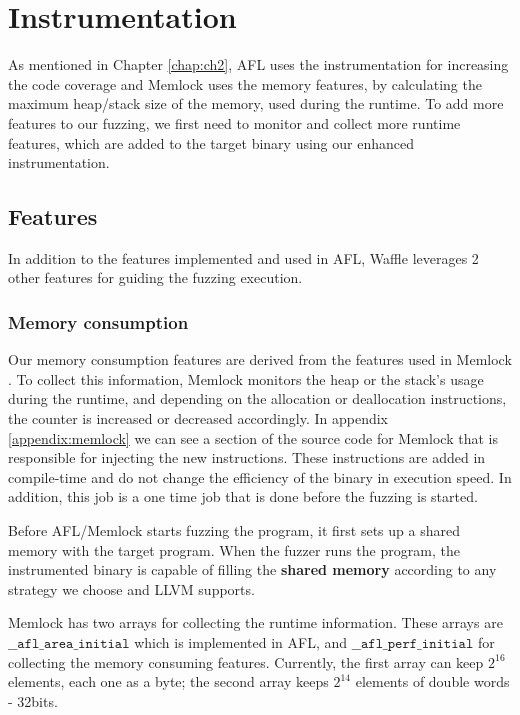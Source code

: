\section{Instrumentation}

As mentioned in Chapter \ref{chap:ch2}, AFL uses the instrumentation for increasing the code coverage and Memlock uses the memory features, by calculating the maximum heap/stack size of the memory, used during the runtime. To add more features to our fuzzing, we first need to monitor and collect more runtime features, which are added to the target binary using our enhanced instrumentation.

\subsection{Features}

In addition to the features implemented and used in AFL, Waffle leverages 2 other features for guiding the fuzzing execution.
\subsubsection{Memory consumption}
Our memory consumption features are derived from the features used in Memlock \cite{wen2020memlock}. To collect this information, Memlock monitors the heap or the stack's usage during the runtime, and depending on the allocation or deallocation instructions, the counter is increased or decreased accordingly. In appendix \ref{appendix:memlock} we can see a section of the source code for Memlock that is responsible for injecting the new instructions. These instructions are added in compile-time and do not change the efficiency of the binary in execution speed. In addition, this job is a one time job that is done before the fuzzing is started.

Before AFL/Memlock starts fuzzing the program, it first sets up a shared memory with the target program. When the fuzzer runs the program, the instrumented binary is capable of filling the \textbf{shared memory} according to any strategy we choose and LLVM supports.

Memlock has two arrays for collecting the runtime information. These arrays are $\texttt{\_\_afl\_area\_initial}$ which is implemented in AFL, and $\texttt{\_\_afl\_perf\_initial}$ for collecting the memory consuming features. Currently, the first array can keep $2^{16}$ elements, each one as a byte; the second array keeps $2^{14}$ elements of double words - 32bits.

